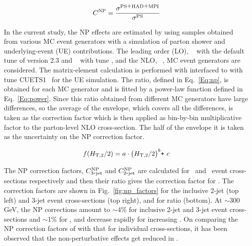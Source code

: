 \begin{equation}
 \label{Eq:np}
 C^{\rm NP} = \frac{\sigma^{\rm PS \plusn HAD \plusn MPI}}{\sigma^{\rm PS}}
\end{equation}

In the current study, the NP effects are estimated by using samples obtained from various MC event generators with a simulation of parton shower and underlying-event (UE) contributions. The leading order (LO), \HERWIGPP~\cite{Bahr:2008pv} with the default tune of version 2.3 and \PYTHIAS~\cite{Sjostrand:2006za} with tune \Ztwostar, and the NLO, \POWHEG~\cite{Nason:2004rx,Frixione:2007vw,Alioli:2010xa}, MC event generators are considered. The matrix-element calculation is performed with \POWHEG interfaced to \PYTHIAE with tune CUETS1~\cite{Khachatryan:2015pea} for the UE simulation. The ratio, defined in Eq.~\ref{Eq:np}, is obtained for each MC generator and is fitted by a power-law function defined in Eq.~\ref{Eq:power}. Since this ratio obtained from different MC generators have large differences, so the average of the envelope, which covers all the differences, is taken as the correction factor which is then applied as bin-by-bin multiplicative factor to the parton-level NLO cross-section. The half of the envelope it is taken as the uncertainty on the NP correction factor. 

\begin{equation}
 \label{Eq:power}
 f(H_{\mathrm{T,2}}/2) = a\cdot\big(H_{\mathrm{T,2}}/2\big)^{b}\texttt{+}~c
\end{equation}

The NP correction factors, $C_{\rm 3\mbox{-} jet}^{\rm NP}$ and $C_{\rm 2\mbox{-} jet}^{\rm NP}$ are calculated for \njt~and \njth~event cross-sections respectively and then their ratio gives the correction factor for \ratio . The correction factors are shown in Fig.~\ref{fig:np_factors} for the inclusive 2-jet (top left) and 3-jet event cross-sections (top right), and for ratio \ratio (bottom). At \httwo $\sim$300 GeV, the NP corrections amount to $\sim$4\% for inclusive 2-jet and 3-jet event cross-sections and $\sim$1\% for \ratio, and decrease rapidly for increasing \httwo. On comparing the NP correction factors of \ratio with that for individual cross-sections, it has been observed that the non-perturbative effects get reduced in \ratio.

